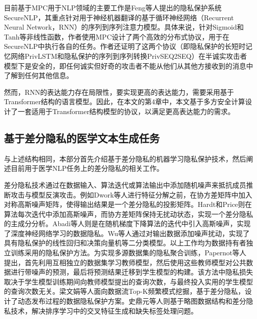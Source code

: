 目前基于MPC用于NLP领域的主要工作是Feng等人\cite{SecureNLP}提出的隐私保护系统SecureNLP，其重点针对用于神经机器翻译的基于循环神经网络（Recurrent Neural Network，RNN）的序列到序列注意力模型。具体来说，针对Sigmoid和Tanh等非线性函数，作者使用MPC设计了两个高效的分布式协议，用于在SecureNLP中执行各自的任务。作者还证明了这两个协议（即隐私保护的长短时记忆网络PrivLSTM和隐私保护的序列到序列转换PrivSEQ2SEQ）在半诚实攻击者模型下是安全的，即任何诚实但好奇的攻击者不能从他们从其他方接收到的消息中了解到任何其他信息。


然而，RNN的表达能力存在局限性，要实现更高的表达能力，需要采用基于Transformer结构的语言模型。因此，在本文的第4章中，本文基于多方安全计算设计了一套适用于Transformer结构模型的协议，以满足更高表达能力的需求。

\subsection{基于差分隐私的医学文本生成任务}

与上述结构相同，本部分首先介绍基于差分隐私的机器学习隐私保护技术，然后阐述目前用于医学NLP任务上的差分隐私的相关工作。

差分隐私技术通过在数据输入、算法迭代或算法输出中添加随机噪声来抵抗成员推断攻击与模型反演攻击。例如Dwork等人\cite{DP}进行特征分解之前，在协方差矩阵中加入对称高斯噪声矩阵，使得输出结果是一个差分隐私的投影矩阵。Hardt和Price\cite{hardt2014noisy}则在算法每次迭代中添加高斯噪声，而协方差矩阵保持无扰动状态，实现一个差分隐私的主成分分析。Abadi\cite{abadi2016deep}等人则是在随机梯度下降算法的迭代中引入高斯噪声，实现了深度神经网络学习的数据隐私。Wu等人\cite{wu2018training}通过对输出数据添加噪声扰动，实现了具有隐私保护的线性回归和决策向量机等二分类模型。以上工作均为数据持有者独立训练采用的隐私保护方法。为实现多源数据集的隐私聚合训练，Papernot\cite{papernot2016semi}等人提出，首先利用互相独立的数据集学习教师模型，然后使用这些教师模型对公共数据进行带噪声的预测，最后将预测结果迁移到学生模型的构建。该方法中隐私损失取决于学生模型训练期间向教师模型提出的查询次数，与最终投入实用的学生模型的查询次数无关。梁文娟等人\cite{lwj2021}面向数据流Top-K频繁模式挖掘，基于差分隐私，设计了动态发布过程的数据隐私保护方案。史鼎元等人\cite{CDFL}则基于略图数据结构和差分隐私技术，解决排序学习中的交叉特征生成和缺失标签处理问题。

